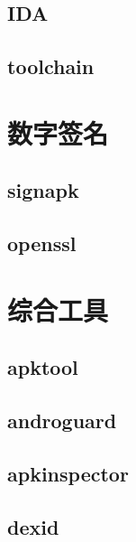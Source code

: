 \subsection{IDA}
\subsection{toolchain}

\section{数字签名}
\subsection{signapk}
\subsection{openssl}

\section{综合工具}
\subsection{apktool}
\subsection{androguard}
\subsection{apkinspector}
\subsection{dexid}